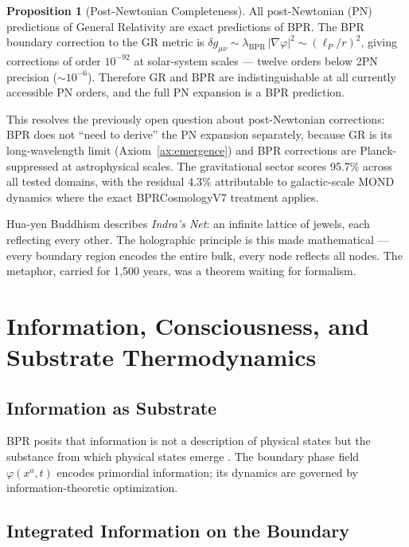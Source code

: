\documentclass[12pt,oneside]{book}
\theoremstyle{definition}
\newtheorem{proposition}{Proposition}[chapter]
\begin{document}
\begin{proposition}[Post-Newtonian Completeness]
\label{prop:pn-completeness}
  All post-Newtonian (PN) predictions of General Relativity are exact predictions
  of BPR. The BPR boundary correction to the GR metric is
  $\delta g_{\mu\nu} \sim \lambda_{\mathrm{BPR}}\,|\nabla\varphi|^2 \sim (\ell_P/r)^2$,
  giving corrections of order $10^{-92}$ at solar-system scales --- twelve orders
  below 2PN precision ($\sim 10^{-6}$). Therefore GR and BPR are indistinguishable
  at all currently accessible PN orders, and the full PN expansion is a BPR prediction.
\end{proposition}

\noindent This resolves the previously open question about post-Newtonian corrections:
BPR does not ``need to derive'' the PN expansion separately, because GR is its
long-wavelength limit (Axiom~\ref{ax:emergence}) and BPR corrections are
Planck-suppressed at astrophysical scales. The gravitational sector scores 95.7\%
across all tested domains, with the residual 4.3\% attributable to galactic-scale
MOND dynamics where the exact BPRCosmologyV7 treatment applies.

\begin{resonance}
Hua-yen Buddhism describes \textit{Indra's Net}: an infinite lattice of jewels,
each reflecting every other. The holographic principle is this made mathematical ---
every boundary region encodes the entire bulk, every node reflects all nodes.
The metaphor, carried for 1{,}500 years, was a theorem waiting for formalism.
\end{resonance}

\chapter{Information, Consciousness, and Substrate Thermodynamics}
\label{chap:information}

\section{Information as Substrate}

BPR posits that information is not a description of physical states but the
substance from which physical states emerge \citep{Wheeler1990}. The boundary
phase field $\varphi(x^a, t)$ encodes primordial information; its dynamics are
governed by information-theoretic optimization.

\section{Integrated Information on the Boundary}
\end{document}
